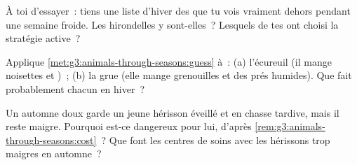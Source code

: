 \begin{exercise}[$\star$]\label{exo:g3:animals-through-seasons:8}
À toi d'essayer~: tiens une liste d'hiver des  que tu vois
vraiment dehors pendant une semaine froide. Les hirondelles y
sont-elles~? Lesquels de tes  ont choisi la stratégie active~?
\end{exercise}

\begin{exercise}[$\star\star$]\label{exo:g3:animals-through-seasons:9}
Applique \cref{met:g3:animals-through-seasons:guess} à~: (a)
l'écureuil (il mange noisettes et )~; (b) la grue (elle mange
grenouilles et  des prés humides). Que fait probablement
chacun en hiver~?
\end{exercise}

\begin{exercise}[$\star\star$]\label{exo:g3:animals-through-seasons:10}
Un automne doux garde un jeune hérisson éveillé et en chasse
tardive, mais il reste maigre. Pourquoi est-ce dangereux pour lui,
d'après \cref{rem:g3:animals-through-seasons:cost}~? Que font les
centres de soins avec les hérissons trop maigres en automne~?
\end{exercise}
